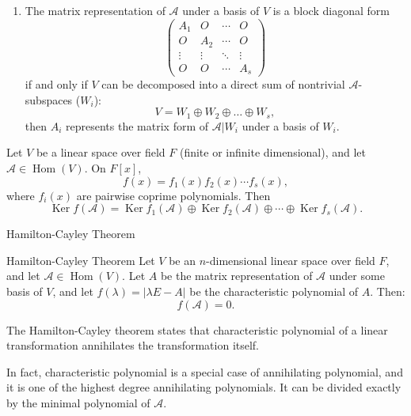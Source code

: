 \documentclass[11pt]{../../TexTemplate/elegantbook} %
\begin{document}
\begin{theorem}
\begin{enumerate}
        \item The matrix representation of \( \mathcal{A} \) under a basis of \( V \) 
            is a block diagonal form 
            \[
            \begin{pmatrix}
                A_1 & O & \cdots & O \\
                O & A_2 & \cdots & O \\
                \vdots & \vdots & \ddots & \vdots \\
                O & O & \cdots & A_s
            \end{pmatrix}
            \]
            if and only if \( V \) can be decomposed into a direct sum of nontrivial \( \mathcal{A} \)-subspaces (\(W_{i}\)):
            \[
            V = W_1 \oplus W_2 \oplus \dots \oplus W_s,
            \]
            then \( A_i \) represents the matrix form of \( \mathcal{A}|{W_i} \) under a basis of \( W_i \).
    \end{enumerate}
\end{theorem}

\begin{proposition}
    Let \( V \) be a linear space over field \( F \) (finite or infinite dimensional), 
    and let \( \mathcal{A}\in \operatorname{Hom}(V) \).
    On \(F[x]\), 
    \[
    f(x) = f_{1}(x)f_{2}(x)\cdots f_{s}(x),
    \]
    where \( f_{i}(x) \) are pairwise coprime polynomials.
    Then
    \[
    \operatorname{Ker}f(\mathcal{A}) 
    = \operatorname{Ker}f_{1}(\mathcal{A}) \oplus 
    \operatorname{Ker}f_{2}(\mathcal{A}) \oplus \cdots \oplus \operatorname{Ker}f_{s}(\mathcal{A}).
    \]
\end{proposition}



\begin{leftbarTitle}{Hamilton-Cayley Theorem}\end{leftbarTitle}
\begin{theorem}{Hamilton-Cayley Theorem}
    Let \( V \) be an \( n \)-dimensional linear space over field \( F \), 
    and let \( \mathcal{A}\in \operatorname{Hom}(V) \).
    Let \( A \) be the matrix representation of \( \mathcal{A} \) under some basis of \( V \),
    and let \( f(\lambda) = |\lambda E - A| \) be the characteristic polynomial of \( A \).
    Then:
    \[
    f(\mathcal{A}) = 0.
    \]
\end{theorem}
\begin{note}
    The Hamilton-Cayley theorem states that characteristic polynomial of a linear transformation
    annihilates the transformation itself.

    In fact, characteristic polynomial is a special case of annihilating polynomial,
    and it is one of the highest degree annihilating polynomials.
    It can be divided exactly by the minimal polynomial of \( \mathcal{A} \).
\end{note}
\end{document}
